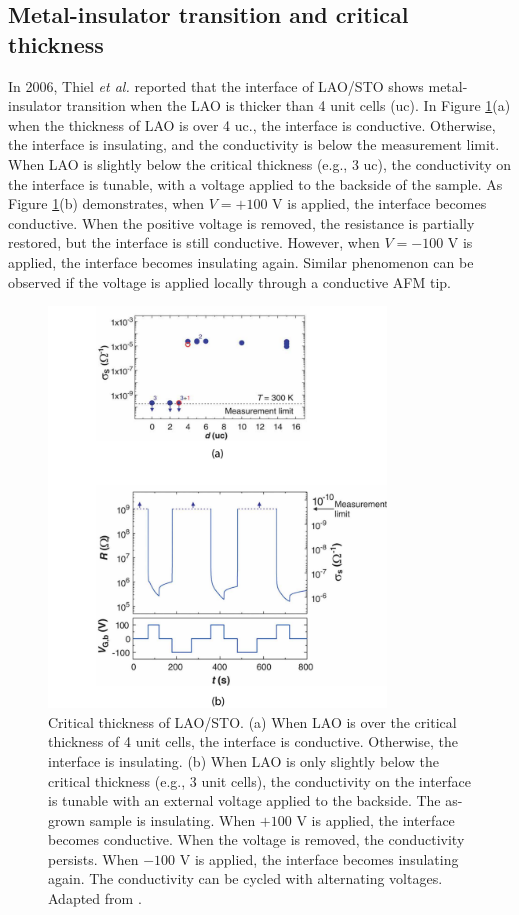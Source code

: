 \documentclass[pdflatex, sectionletters, 12pt]{pittetd}    %
\begin{document}
\subsection{Metal-insulator transition and critical thickness}

In 2006, Thiel \textit{et al.} \cite{thiel2006tunable} reported that the interface of LAO/STO shows metal-insulator transition when the LAO is thicker than 4 unit cells (uc). In Figure \ref{FIG:CriticalThickness}(a) when the thickness of LAO is over 4 uc., the interface is conductive. Otherwise, the interface is insulating, and the conductivity is below the measurement limit. When LAO is slightly below the critical thickness (e.g., 3 uc), the conductivity on the interface is tunable, with a voltage applied to the backside of the sample. As Figure \ref{FIG:CriticalThickness}(b) demonstrates, when $V = +100$ V is applied, the interface becomes conductive. When the positive voltage is removed, the resistance is partially restored, but the interface is still conductive. However, when $V = -100$ V is applied, the interface becomes insulating again. Similar phenomenon can be observed if the voltage is applied locally through a conductive AFM tip. 

\begin{figure}[p]
	\centering
	\includegraphics[width=0.8\textwidth]{Drawing/CriticalThickness.pdf}
	\caption{Critical thickness of LAO/STO. (a) When LAO is over the critical thickness of 4 unit cells, the interface is conductive. Otherwise, the interface is insulating. (b) When LAO is only slightly below the critical thickness (e.g., 3 unit cells), the conductivity on the interface is tunable with an external voltage applied to the backside. The as-grown sample is insulating. When $+100$ V is applied, the interface becomes conductive. When the voltage is removed, the conductivity persists. When $-100$ V is applied, the interface becomes insulating again. The conductivity can be cycled with alternating voltages. Adapted from \cite{thiel2006tunable}.}
	\label{FIG:CriticalThickness}
\end{figure}
\end{document}
